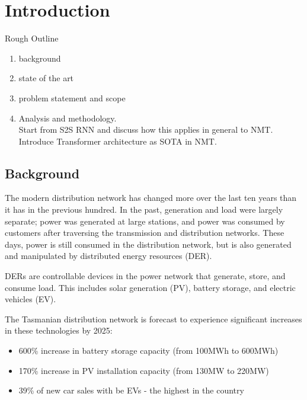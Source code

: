 \chapter{Introduction}

Rough Outline
\begin{enumerate}
	\item background
	\item state of the art
	\item problem statement and scope
	\item Analysis and methodology. \\
		  Start from S2S RNN and discuss how this applies in general to NMT.
		  Introduce Transformer architecture as SOTA in NMT.
		  
\end{enumerate}


\section{Background}
\par
The modern distribution network has changed more over the last ten years than it has in the previous hundred.
In the past, generation and load were largely separate; power was generated at large stations, and power was consumed by customers after traversing the transmission and distribution networks. 
These days, power is still consumed in the distribution network, but is also generated and manipulated by distributed energy resources (DER). 
\par
DERs are controllable devices in the power network that generate, store, and consume load. 
This includes solar generation (PV), battery storage, and electric vehicles (EV). 
\par
The Tasmanian distribution network is forecast to experience significant increases in these technologies by 2025: \\
\begin{itemize}
	\item 600\% increase in battery storage capacity (from 100MWh to 600MWh) \cite{Jacobs2017}
	\item 170\% increase in PV installation capacity (from 130MW to 220MW) \cite{Jacobs2017}
	\item 39\% of new car sales with be EVs - the highest in the country \cite{AEMO2016}
\end{itemize}


